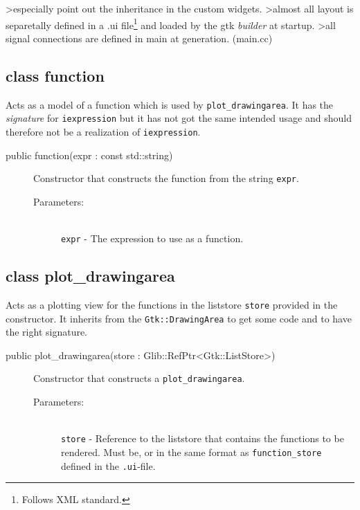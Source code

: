 \documentclass[a4paper,11pt]{kth-mag}
\begin{document}
>especially point out the inheritance in the custom widgets.
>almost all layout is separetally defined in a .ui file\footnote{Follows XML
standard.} and loaded by the gtk \emph{builder} at startup.
>all signal connections are defined in main at generation. (main.cc)


\subsection{class function}
Acts as a model of a function which is used by \texttt{plot\_drawingarea}.
It has the \emph{signature} for \texttt{iexpression} but it has not got the
same intended usage and should therefore not be a realization of
\texttt{iexpression}.

\begin{description}
    \item[public function(expr : const std::string)] Constructor 
    that constructs the function from the string \texttt{expr}.
    \begin{description}
        \item[Parameters:]~\\
            \verb+expr+ - The expression to use as a function.
    \end{description}
\end{description}

\subsection{class plot\_drawingarea}
Acts as a plotting view for the functions in the liststore \texttt{store}
provided in the constructor. It inherits from the \texttt{Gtk::DrawingArea} to
get some code and to have the right signature.

\begin{description}
    \item[public plot\_drawingarea(store : Glib::RefPtr<Gtk::ListStore>)] Constructor 
    that constructs a \texttt{plot\_drawingarea}. 
    \begin{description}
        \item[Parameters:]~\\
            \verb+store+ - Reference to the liststore that contains the
            functions to be rendered. Must be, or in the same format as
            \texttt{function\_store} defined in the \texttt{.ui}-file.
    \end{description}
\end{description}
\end{document}
